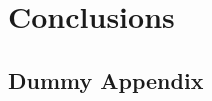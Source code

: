 \documentclass[nofilelist]{cslthse-msc}
\begin{document}
\chapter{Conclusions}



{}

\begin{appendices}
\chapter{Dummy Appendix}






\printfilelist

\checkoddpage
\ifoddpage
\else
   \newpage
   \thispagestyle{empty}
   \mbox{ }
\fi

\end{appendices}
\end{document}
